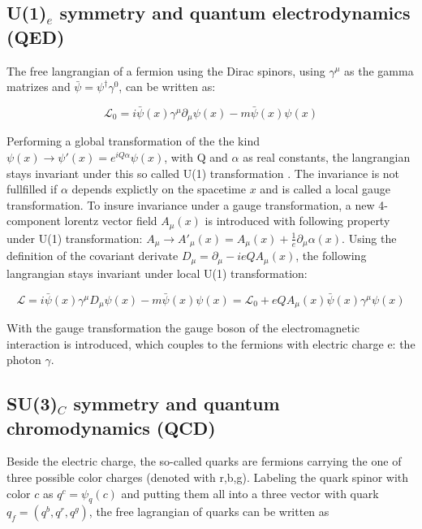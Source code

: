 \subsection{U(1)${_e}$ symmetry and quantum electrodynamics (\gls{QED})}
\label{sec:section_1_1_1}

The free langrangian of a fermion using the Dirac spinors, using $\gamma^{\mu}$ as the gamma matrizes and $\bar{\psi} = \psi^{\dagger}\gamma^{0}$, can be written as:

\begin{equation}
	\label{eq:eq_1_1}
	\mathcal{L}_{0} =  i\bar{\psi}(x)\gamma^{\mu}\partial_{\mu}\psi(x) - m\bar{\psi}(x)\psi(x)
\end{equation}

Performing a global transformation of the the kind $\psi(x) \rightarrow \psi'(x) = e^{iQ\alpha}\psi(x)$, with Q and $\alpha$ as real constants, the langrangian stays invariant under this so called U(1) transformation \cite{SM}. The invariance is not fullfilled if $\alpha$ depends explictly on the spacetime $x$ and is called a local gauge transformation. To insure invariance under a gauge transformation, a new 4-component lorentz vector field $A_{\mu}(x)$ is introduced with following property under U(1) transformation: $A_{\mu} \rightarrow A'_{\mu}(x) = A_{\mu}(x) + \frac{1}{e}\partial_{\mu}\alpha(x)$. Using the definition of the covariant derivate $D_{\mu} = \partial_{\mu} - ieQA_{\mu}(x)$, the following langrangian stays invariant under local U(1) transformation:

\begin{equation}
	\label{eq:eq_1_2}
	\mathcal{L} = i\bar{\psi}(x)\gamma^{\mu}D_{\mu}\psi(x) - m\bar{\psi}(x)\psi(x) = \mathcal{L}_{0} + eQA_{\mu}(x)\bar{\psi}(x)\gamma^{\mu}\psi(x)
\end{equation}

With the gauge transformation the gauge boson of the electromagnetic interaction is introduced, which couples to the fermions with electric charge e: the photon $\gamma$.


\subsection{SU(3)${_C}$ symmetry and quantum chromodynamics (\gls{QCD})}
\label{sec:section_1_1_2}

Beside the electric charge, the so-called quarks are fermions carrying the one of three possible color charges (denoted with r,b,g). Labeling the quark spinor with color $c$ as $q^{c} = \psi_{q}(c)$ and putting them all into a three vector with quark $q_{f} = (q^{b}, q^{r}, q^{g})$, the free lagrangian of quarks can be written as

